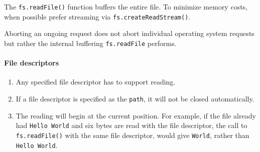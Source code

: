 \begin{Shaded}
\begin{Highlighting}[]
 \OperatorTok{;}

\OperatorTok{=}  \NormalTok{()}\OperatorTok{;}
\OperatorTok{=}\OperatorTok{;}
\NormalTok{(fileInfo[}\NormalTok{]}\OperatorTok{,}\OperatorTok{,}\OperatorTok{,}\KeywordTok{=\textgreater{}}\NormalTok{ \{}
\NormalTok{\})}\OperatorTok{;}
\NormalTok{()}\OperatorTok{;}
\end{Highlighting}
\end{Shaded}

The \texttt{fs.readFile()} function buffers the entire file. To minimize
memory costs, when possible prefer streaming via
\texttt{fs.createReadStream()}.

Aborting an ongoing request does not abort individual operating system
requests but rather the internal buffering \texttt{fs.readFile}
performs.

\paragraph{File descriptors}\label{file-descriptors}

\begin{enumerate}
\def\labelenumi{\arabic{enumi}.}
\tightlist
\item
  Any specified file descriptor has to support reading.
\item
  If a file descriptor is specified as the \texttt{path}, it will not be
  closed automatically.
\item
  The reading will begin at the current position. For example, if the
  file already had
  \texttt{\textquotesingle{}Hello\ World\textquotesingle{}} and six
  bytes are read with the file descriptor, the call to
  \texttt{fs.readFile()} with the same file descriptor, would give
  \texttt{\textquotesingle{}World\textquotesingle{}}, rather than
  \texttt{\textquotesingle{}Hello\ World\textquotesingle{}}.
\end{enumerate}

